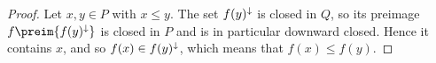 \begin{proof}
    Let $x,y \in P$ with $x \leq y$. The set $f(y)^\downarrow$ is closed in $Q$, so its preimage $f\preim{\downset{f(y)}}$ is closed in $P$ and is in particular downward closed. Hence it contains $x$, and so $f(x) \in f(y)^\downarrow$, which means that $f(x) \leq f(y)$.
\end{proof}









